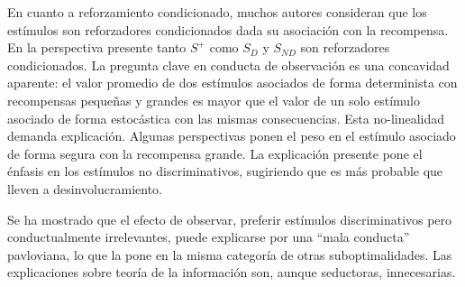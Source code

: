 \documentclass[a4paper,12pt]{article}
\begin{document}
En cuanto a reforzamiento condicionado, muchos autores consideran que los estímulos son reforzadores condicionados dada su asociación con la recompensa. En la perspectiva presente tanto $S^{+}$ como $S_{D}$ y $S_{ND}$ son reforzadores condicionados. La pregunta clave en conducta de observación es una concavidad aparente: el valor promedio de dos estímulos asociados de forma determinista con recompensas pequeñas y grandes es mayor que el valor de un solo estímulo asociado de forma estocástica con las mismas consecuencias. Esta no-linealidad demanda explicación. Algunas perspectivas ponen el peso en el estímulo asociado de forma segura con la recompensa grande. La explicación presente pone el énfasis en los estímulos no discriminativos, sugiriendo que es más probable que lleven a desinvolucramiento. 

Se ha mostrado que el efecto de observar, preferir estímulos discriminativos pero conductualmente irrelevantes, puede explicarse por una ``mala conducta'' pavloviana, lo que la pone en la misma categoría de otras suboptimalidades. Las explicaciones sobre teoría de la información son, aunque seductoras, innecesarias.
\end{document}
